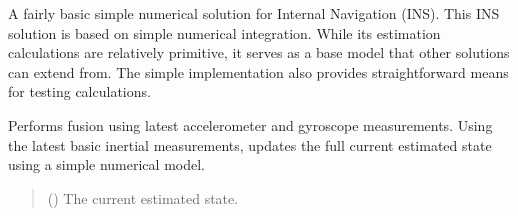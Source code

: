 \documentclass[letterpaper,10pt,english]{sphinxmanual}
\begin{document}
\begin{fulllineitems}
\label{\detokenize{modules/fusion/ins:qnav.fusion.ins.NumericalINS}}
\pysigstartsignatures
{}
\pysigstopsignatures
\sphinxAtStartPar
A fairly basic simple numerical solution for Internal Navigation (INS).
This INS solution is based on simple numerical integration. While its
estimation calculations are relatively primitive, it serves as a base
model that other solutions can extend from. The simple implementation
also provides straight\sphinxhyphen{}forward means for testing calculations.

\begin{fulllineitems}
\label{\detokenize{modules/fusion/ins:qnav.fusion.ins.NumericalINS.perform_fusion}}
\pysigstartsignatures
{}
\pysigstopsignatures
\sphinxAtStartPar
Performs fusion using latest accelerometer and gyroscope measurements.
Using the latest basic inertial measurements, updates the full current
estimated state using a simple numerical model.
\begin{quote}\begin{description}
\sphinxAtStartPar
{} ({\hyperref[\detokenize{modules/estimation/state:qnav.estimation.state.EstimatedState}]{}}) \textendash{} The current estimated state.


\end{description}
\end{quote}
\end{fulllineitems}
\end{fulllineitems}
\end{document}
